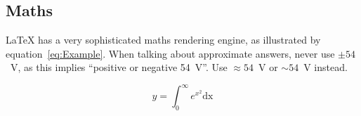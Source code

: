 \subsection{Maths}
\LaTeX{} has a very sophisticated maths rendering engine, as illustrated by equation~\ref{eq:Example}.  When talking about approximate answers, never use $\pm{54}$~V, as this implies ``positive or negative 54~V''.  Use $\approx{54}$~V or $\sim{54}$~V instead.

\begin{equation}
 y = \int_0^\infty e^{x^2} \mathrm{dx}
 \label{eq:Example}
\end{equation}


